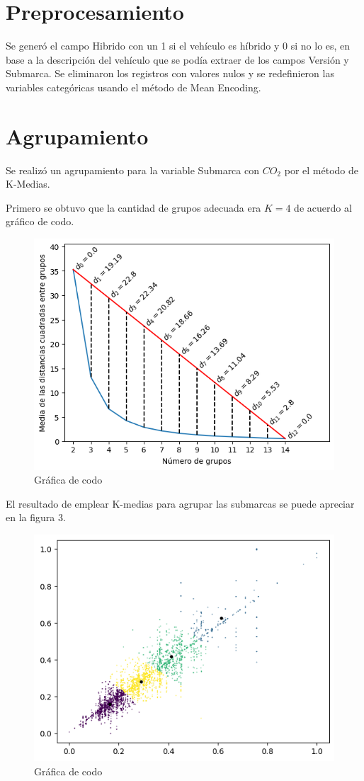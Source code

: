 \documentclass{article}
\begin{document}
\newpage

\section{Preprocesamiento}

Se generó el campo Hibrido con un 1 si el vehículo es híbrido y 0 si no lo es, en base a la descripción del vehículo que se podía extraer de los campos Versión y Submarca. Se eliminaron los registros con valores nulos y se redefinieron las variables categóricas usando el método de Mean Encoding.


\section{Agrupamiento}

Se realizó un agrupamiento para la variable Submarca con $CO_2$ por el método de K-Medias.

Primero se obtuvo que la cantidad de grupos adecuada era $K=4$ de acuerdo al gráfico de codo.

\begin{figure}[h]
  \centering
  \includegraphics[width=.7\linewidth]{imagenes/2_codo.png}
  \caption{Gráfica de codo}
  \label{fig:nombre}
\end{figure}

\newpage

El resultado de emplear K-medias para agrupar las submarcas se puede apreciar en la figura 3.

\begin{figure}[h]
  \centering
  \includegraphics[width=.65\linewidth]{imagenes/3_k-medias.png}
  \caption{Gráfica de codo}
  \label{fig:nombre}
\end{figure}
\end{document}
